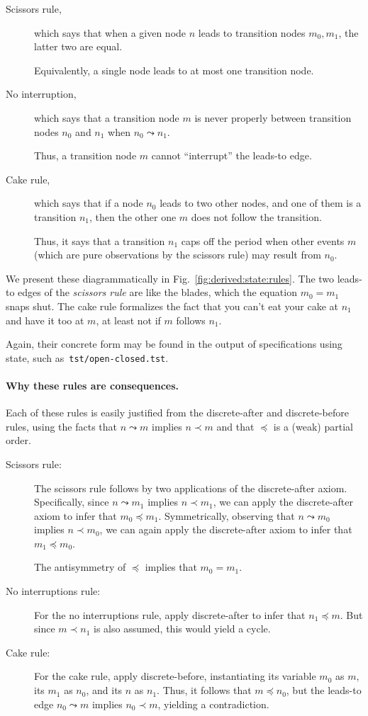 \begin{description}
  \item[Scissors rule,] which says that when a given node $n$ leads to
  transition nodes $m_0,m_1$, the latter two are equal.

  Equivalently, a single node leads to at most one transition node.
  \item[No interruption,] which says that a transition node $m$ is
  never properly between transition nodes $n_0$ and $n_1$ when
  $n_0\leadsto n_1$.

  Thus, a transition node $m$ cannot ``interrupt'' the leads-to edge.
  \item[Cake rule,] which says that if a node $n_0$ leads to two other
  nodes, and one of them is a transition $n_1$, then the other one $m$
  does not follow the transition.

  Thus, it says that a transition $n_1$ caps off the period when other
  events $m$ (which are pure observations by the scissors rule) may
  result from $n_0$.
\end{description}
%
We present these diagrammatically in
Fig.~\ref{fig:derived:state:rules}.  The two leads-to edges of the
\emph{scissors rule} are like the blades, which the equation
${m_0=m_1}$ snaps shut.  The cake rule formalizes the fact that you
can't eat your cake at $n_1$ and have it too at $m$, at least not if
$m$ follows $n_1$.

Again, their concrete form may be found in the output of {\cpsa}
specifications using state, such as~\texttt{tst/open-closed.tst}.

\paragraph{Why these rules are consequences.}  Each of these rules is
easily justified from the discrete-after and discrete-before rules,
using the facts that $n\leadsto m$ implies $n\prec m$ and that
$\preceq$ is a (weak) partial order.

\begin{description}
  \item[Scissors rule:]  The scissors rule follows by two applications
  of the discrete-after axiom.  Specifically, since $n\leadsto m_1$
  implies $n\prec m_1$, we can apply the discrete-after axiom to infer
  that $m_0\preceq m_1$.  Symmetrically, observing that
  $n\leadsto m_0$ implies $n\prec m_0$, we can again apply the
  discrete-after axiom to infer that $m_1\preceq m_0$.

  The antisymmetry of $\preceq$ implies that $m_0=m_1$.
  \item[No interruptions rule:]  For the no interruptions rule, apply
  discrete-after to infer that $n_1\preceq m$.  But since
  $m \prec n_1$ is also assumed, this would yield a cycle.
  \item[Cake rule:]  For the cake rule, apply discrete-before,
  instantiating its variable $m_0$ as $m$, its $m_1$ as $n_0$, and its
  $n$ as $n_1$.  Thus, it follows that $m\preceq n_0$, but the
  leads-to edge $n_0\leadsto m$ implies $n_0\prec m$, yielding a
  contradiction.
\end{description}

